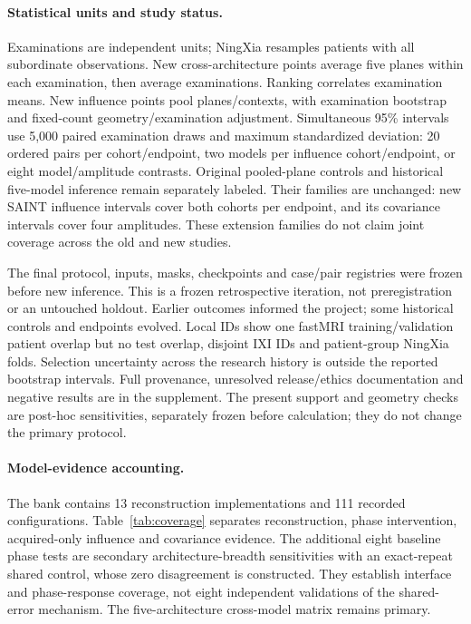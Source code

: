\documentclass[10pt,twocolumn,letterpaper]{article}
\begin{document}
\paragraph{Statistical units and study status.}
Examinations are independent units; NingXia resamples patients with all subordinate observations. New cross-architecture points average five planes within each examination, then average examinations. Ranking correlates examination means. New influence points pool planes/contexts, with examination bootstrap and fixed-count geometry/examination adjustment. Simultaneous 95\% intervals use 5,000 paired examination draws and maximum standardized deviation: 20 ordered pairs per cohort/endpoint, two models per influence cohort/endpoint, or eight model/amplitude contrasts. Original pooled-plane controls and historical five-model inference remain separately labeled. Their families are unchanged: new SAINT influence intervals cover both cohorts per endpoint, and its covariance intervals cover four amplitudes. These extension families do not claim joint coverage across the old and new studies.

The final protocol, inputs, masks, checkpoints and case/pair registries were frozen before new inference. This is a frozen retrospective iteration, not preregistration or an untouched holdout. Earlier outcomes informed the project; some historical controls and endpoints evolved. Local IDs show one fastMRI training/validation patient overlap but no test overlap, disjoint IXI IDs and patient-group NingXia folds. Selection uncertainty across the research history is outside the reported bootstrap intervals. Full provenance, unresolved release/ethics documentation and negative results are in the supplement. The present support and geometry checks are post-hoc sensitivities, separately frozen before calculation; they do not change the primary protocol.

\paragraph{Model-evidence accounting.}
The bank contains 13 reconstruction implementations and 111 recorded configurations. Table~\ref{tab:coverage} separates reconstruction, phase intervention, acquired-only influence and covariance evidence. The additional eight baseline phase tests are secondary architecture-breadth sensitivities with an exact-repeat shared control, whose zero disagreement is constructed. They establish interface and phase-response coverage, not eight independent validations of the shared-error mechanism. The five-architecture cross-model matrix remains primary.

\end{document}
